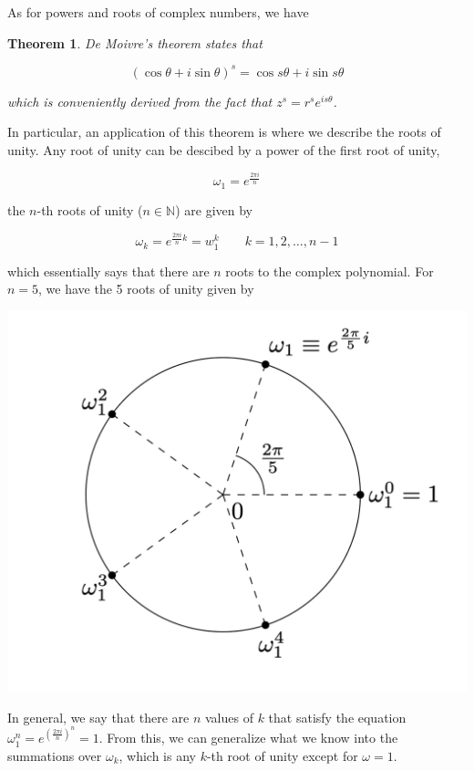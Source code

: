 \documentclass[12pt]{article}
\theoremstyle{plain}
\newtheorem{theorem}{Theorem}[section]
\theoremstyle{definition}
\begin{document}
As for powers and roots of complex numbers, we have 

\begin{theorem}
    De Moivre's theorem states that

    $$(\cos \theta + i \sin \theta)^s = \cos{s \theta} + i \sin{s \theta}$$

    which is conveniently derived from the fact that $z^s = r^s e^{is\theta}$.
\end{theorem}

In particular, an application of this theorem is where we describe the roots of unity. Any root of unity can be descibed by a power of the first root of unity, 

$$\omega_1 = e^\frac{2 \pi i}{n}$$

the $n$-th roots of unity ($n \in \mathbb{N}$) are given by

$$
\omega_k = e^{\frac{2\pi i}{n} k} = w_1^k \qquad k = 1, 2, \ldots, n-1
$$

which essentially says that there are $n$ roots to the complex polynomial. For $n=5$, we have the 5 roots of unity given by

\includegraphics[width=\textwidth]{3_roots_unity}

In general, we say that there are $n$ values of $k$ that satisfy the equation $\displaystyle \omega_1^n = e^{(\frac{2 \pi i}{n})^n} = 1$. From this, we can generalize what we know into the summations over $\omega_k$, which is any $k$-th root of unity except for $\omega = 1$. 
\end{document}
